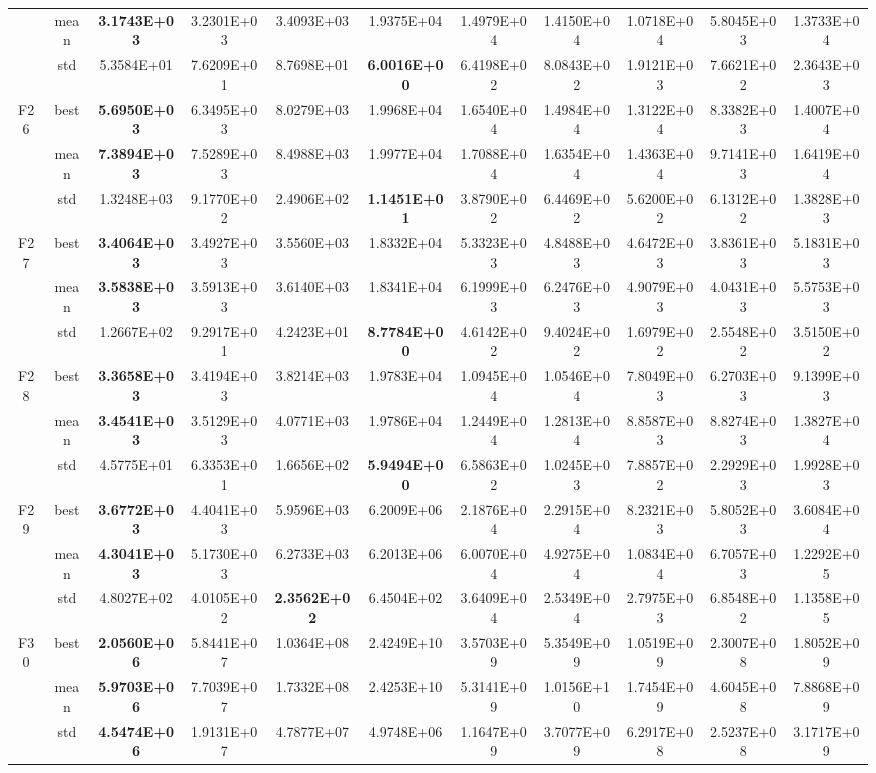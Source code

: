 \documentclass{wzuthesis}
\begin{document}
\begin{longtable}{ccccccccccc}
          & mean  & \textbf{3.1743E+03} & 3.2301E+03 & 3.4093E+03 & 1.9375E+04 & 1.4979E+04 & 1.4150E+04 & 1.0718E+04 & 5.8045E+03 & 1.3733E+04 \\
          & std   & 5.3584E+01 & 7.6209E+01 & 8.7698E+01 & \textbf{6.0016E+00} & 6.4198E+02 & 8.0843E+02 & 1.9121E+03 & 7.6621E+02 & 2.3643E+03 \\
\multirow{3}[0]{*}{F26} & best  & \textbf{5.6950E+03} & 6.3495E+03 & 8.0279E+03 & 1.9968E+04 & 1.6540E+04 & 1.4984E+04 & 1.3122E+04 & 8.3382E+03 & 1.4007E+04 \\
          & mean  & \textbf{7.3894E+03} & 7.5289E+03 & 8.4988E+03 & 1.9977E+04 & 1.7088E+04 & 1.6354E+04 & 1.4363E+04 & 9.7141E+03 & 1.6419E+04 \\
          & std   & 1.3248E+03 & 9.1770E+02 & 2.4906E+02 & \textbf{1.1451E+01} & 3.8790E+02 & 6.4469E+02 & 5.6200E+02 & 6.1312E+02 & 1.3828E+03 \\
\multirow{3}[0]{*}{F27} & best  & \textbf{3.4064E+03} & 3.4927E+03 & 3.5560E+03 & 1.8332E+04 & 5.3323E+03 & 4.8488E+03 & 4.6472E+03 & 3.8361E+03 & 5.1831E+03 \\
          & mean  & \textbf{3.5838E+03} & 3.5913E+03 & 3.6140E+03 & 1.8341E+04 & 6.1999E+03 & 6.2476E+03 & 4.9079E+03 & 4.0431E+03 & 5.5753E+03 \\
          & std   & 1.2667E+02 & 9.2917E+01 & 4.2423E+01 & \textbf{8.7784E+00} & 4.6142E+02 & 9.4024E+02 & 1.6979E+02 & 2.5548E+02 & 3.5150E+02 \\
\multirow{3}[0]{*}{F28} & best  & \textbf{3.3658E+03} & 3.4194E+03 & 3.8214E+03 & 1.9783E+04 & 1.0945E+04 & 1.0546E+04 & 7.8049E+03 & 6.2703E+03 & 9.1399E+03 \\
          & mean  & \textbf{3.4541E+03} & 3.5129E+03 & 4.0771E+03 & 1.9786E+04 & 1.2449E+04 & 1.2813E+04 & 8.8587E+03 & 8.8274E+03 & 1.3827E+04 \\
          & std   & 4.5775E+01 & 6.3353E+01 & 1.6656E+02 & \textbf{5.9494E+00} & 6.5863E+02 & 1.0245E+03 & 7.8857E+02 & 2.2929E+03 & 1.9928E+03 \\
\multirow{3}[0]{*}{F29} & best  & \textbf{3.6772E+03} & 4.4041E+03 & 5.9596E+03 & 6.2009E+06 & 2.1876E+04 & 2.2915E+04 & 8.2321E+03 & 5.8052E+03 & 3.6084E+04 \\
          & mean  & \textbf{4.3041E+03} & 5.1730E+03 & 6.2733E+03 & 6.2013E+06 & 6.0070E+04 & 4.9275E+04 & 1.0834E+04 & 6.7057E+03 & 1.2292E+05 \\
          & std   & 4.8027E+02 & 4.0105E+02 & \textbf{2.3562E+02} & 6.4504E+02 & 3.6409E+04 & 2.5349E+04 & 2.7975E+03 & 6.8548E+02 & 1.1358E+05 \\
\multirow{3}[0]{*}{F30} & best  & \textbf{2.0560E+06} & 5.8441E+07 & 1.0364E+08 & 2.4249E+10 & 3.5703E+09 & 5.3549E+09 & 1.0519E+09 & 2.3007E+08 & 1.8052E+09 \\
          & mean  & \textbf{5.9703E+06} & 7.7039E+07 & 1.7332E+08 & 2.4253E+10 & 5.3141E+09 & 1.0156E+10 & 1.7454E+09 & 4.6045E+08 & 7.8868E+09 \\
          & std   & \textbf{4.5474E+06} & 1.9131E+07 & 4.7877E+07 & 4.9748E+06 & 1.1647E+09 & 3.7077E+09 & 6.2917E+08 & 2.5237E+08 & 3.1717E+09 \\


\end{longtable}
\end{document}
